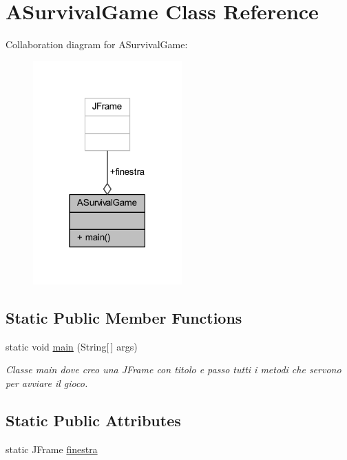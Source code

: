 \hypertarget{classa_1_1survival_1_1game_1_1_a_survival_game}{}\section{A\+Survival\+Game Class Reference}
\label{classa_1_1survival_1_1game_1_1_a_survival_game}


Collaboration diagram for A\+Survival\+Game\+:
\nopagebreak
\begin{figure}[H]
\begin{center}
\leavevmode
\includegraphics[width=162pt]{classa_1_1survival_1_1game_1_1_a_survival_game__coll__graph}
\end{center}
\end{figure}
\subsection*{Static Public Member Functions}
\begin{DoxyCompactItemize}
\item 
static void \hyperlink{classa_1_1survival_1_1game_1_1_a_survival_game_a8b260eecbaabcef8473fd87ada040682}{main} (String\mbox{[}$\,$\mbox{]} args)
\begin{DoxyCompactList}\small\item\em Classe main dove creo una J\+Frame con titolo e passo tutti i metodi che servono per avviare il gioco. \end{DoxyCompactList}\end{DoxyCompactItemize}
\subsection*{Static Public Attributes}
\begin{DoxyCompactItemize}
\item 
static J\+Frame \hyperlink{classa_1_1survival_1_1game_1_1_a_survival_game_a2566c4e674dd7ca4c0f6d0097845f6a6}{finestra}
\end{DoxyCompactItemize}


